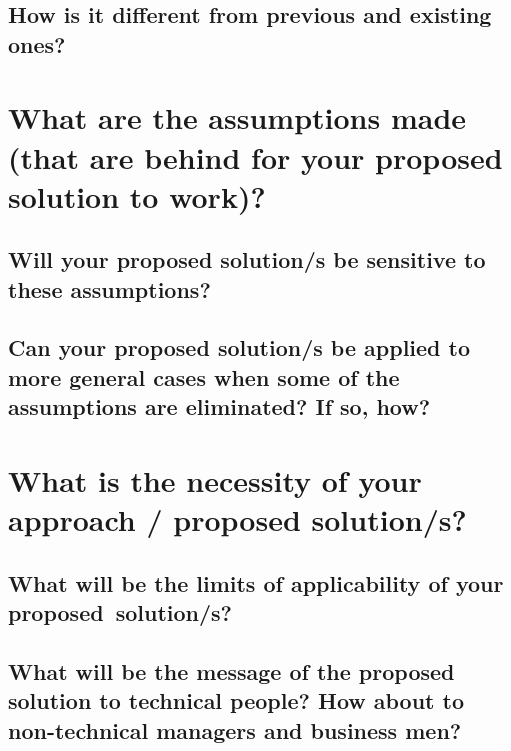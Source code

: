 \textcolor[rgb]{0.75,0.75,0.75}{\blindtext}

\subsection*{How is it different from previous and existing ones?}

\textcolor[rgb]{0.75,0.75,0.75}{\blindtext}
	
	
	
	
	
	
\section*{What are the assumptions made (that are behind for your proposed solution to work)?}
	
\textcolor[rgb]{0.75,0.75,0.75}{\blindtext}
		
	
\subsection*{Will your proposed solution/s be sensitive to these assumptions?}
	
\textcolor[rgb]{0.75,0.75,0.75}{\blindtext}

  
\subsection*{Can your proposed solution/s be applied to more general cases when some of the assumptions are eliminated? If so, how?}

\textcolor[rgb]{0.75,0.75,0.75}{\blindtext}






\section*{What is the necessity of your approach / proposed solution/s?}

\textcolor[rgb]{0.75,0.75,0.75}{\blindtext}
	
	
\subsection*{What will be the limits of applicability of your proposed~solution/s?}

\textcolor[rgb]{0.75,0.75,0.75}{\blindtext}
				
						
\subsection*{What will be the message of the proposed solution to technical people?  How about to non-technical managers and business men?}
			
